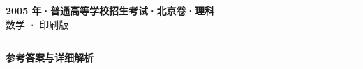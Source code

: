 \documentclass[zihao=5, a4paper]{ctexart}
\begin{document}
\begin{center}
  {\Large\bfseries 2005 年·普通高等学校招生考试·北京卷·理科}\\[4pt]
  {\large 数学 · 印刷版}
\end{center}
\medskip
{}

\par\bigskip\hrule\bigskip
{}
\begin{center}{\large\bfseries 参考答案与详细解析}\end{center}
\smallskip

\end{document}
